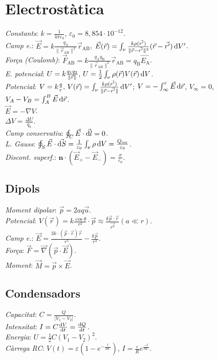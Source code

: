 \section{Electrostàtica} 
\emph{Constants}: $k=\frac{1}{4\pi\varepsilon_0}$, $\varepsilon_0=8,854\cdot 10^{-12}$. \\ 
\emph{Camp e.}: $\vec{E} = k\frac{q_\text{A}}{\|\vec{r}_{\text{AB}}\|^3}\vec{r}_{\text{AB}}$, $\vec{E}(\vec{r}) = \int_\nu \frac{k\rho(\vec{r'})}{\|\vec{r}-\vec{r'}\|^3}(\vec{r}-\vec{r'}) \dif V'$. \\ 
\emph{Força (Coulomb)}: $\vec{F}_{\text{AB}} = k\frac{q_{\text{A}}q_{\text{B}}}{\|\vec{r}_{\text{AB}}\|^3}\vec{r}_{\text{AB}}=q_\text{B}\vec{E_\text{A}}$. \\ 
\emph{E. potencial}: $U = k\frac{q_1q_2}{\|\vec{r}\|},\, U = \frac{1}{2}\int_\nu \rho(\vec{r})V(\vec{r})\dif V$. \\
\emph{Potencial}: $V = k \frac{q}{r},\, V(\vec{r}) = \int_\nu \frac{k\rho(\vec{r'})}{\|\vec{r}-\vec{r'}\|}\dif V'$; $V=-\int_{\infty}^r \vec{E} \dif \vec{r}$, $V_{\infty}=0$, $V_A -V_B = \int_A^B \vec{E} \dif \vec{r}$. \\
\ci $\vec{E}=-\nabla V$. \\
\ci $\Delta V = \frac{\Delta U}{q_0}$. \\
\emph{Camp conservatiu}: $\oint_C \vec{E} \cdot \vec{\dif l} = 0$. \\
\emph{L. Gauss}: $\oint_S \vec{E}\cdot \vec{\dif S} = \frac{1}{\varepsilon_0} \int_\nu \rho \dif V = \frac{Q_\text{int}}{\varepsilon_0}$.\\
\emph{Discont. superf.}: $\boldsymbol{n} \cdot (\vec{E}_+ - \vec{E}_-) = \frac{\sigma}{\varepsilon_0}$.

\subsection{Dipols}
\emph{Moment dipolar}: $\vec{p} = 2aq\vec{u}$. \\
\emph{Potencial}: $V(\vec{r}) = k\frac{\cos \theta}{r^2}\cdot \vec{p} \approx \frac{k\vec{p}\cdot\vec{r}}{\vec{r^3}} (a \ll r)$. \\
\emph{Camp e.}: $\vec{E} = \frac{3k\cdot (\vec{p}\cdot\vec{r})\vec{r}}{r^5} - \frac{k\vec{p}}{r^3}$. \\
\emph{Força}: $\vec{F} = \vec{\nabla}(\vec{p}\cdot \vec{E})$. \\
\emph{Moment}: $\vec{M} = \vec{p}\times \vec{E}$.



\subsection{Condensadors}
\emph{Capacitat}: $C = \frac{Q}{|V_1-V_2|}$. \\
\emph{Intensitat}: $I=C\frac{\dif V}{\dif t} = \frac{\dif Q}{\dif t}$.\\
\emph{Energia}: $U = \frac{1}{2}C (V_1-V_2)^2$.\\
\emph{Càrrega RC}: $V(t) = \varepsilon (1 -  e^{-\frac{t}{RC}})$, 
                    $I = \frac{\varepsilon}{R} e^{\frac{-t}{RC}}$.

